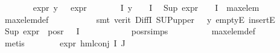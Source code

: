 \begin{isabellebody}
\ \ \ \ \ \ \isamarkupfalse%
\ {\isacartoucheopen}expr{\isacharunderscore}{\kern0pt}{}\ y\ {\isasymge}\ {}{\isacartoucheclose}\ {\isacartoucheopen}expr{\isacharunderscore}{\kern0pt}{}\ {\isasympsi}\ {\isasymge}\ {}{\isacartoucheclose}\ {\isacartoucheopen}{\isasympsi}\ {\isasymin}\ {\isasymPhi}\ {\isacharbackquote}{\kern0pt}\ I{\isacartoucheclose}\ {\isacartoucheopen}y\ {\isasymin}\ {\isasymPhi}\ {\isacharbackquote}{\kern0pt}\ I{\isacartoucheclose}\ \isamarkupfalse%
\ {\isachardoublequoteopen}Sup\ {\isacharparenleft}{\kern0pt}expr{\isacharunderscore}{\kern0pt}{}\ {\isacharbackquote}{\kern0pt}\ {\isacharparenleft}{\kern0pt}{\isacharparenleft}{\kern0pt}{\isasymPhi}\ {\isacharbackquote}{\kern0pt}\ I{\isacharparenright}{\kern0pt}\ {\isacharminus}{\kern0pt}\ {\isacharbraceleft}{\kern0pt}max{\isacharunderscore}{\kern0pt}elem{\isacharbraceright}{\kern0pt}{\isacharparenright}{\kern0pt}{\isacharparenright}{\kern0pt}\ {\isachargreater}{\kern0pt}{\isacharequal}{\kern0pt}\ {}{\isachardoublequoteclose}\isanewline
\ \ \ \ \ \ \ \ \isamarkupfalse%
\ max{\isacharunderscore}{\kern0pt}elem{\isacharunderscore}{\kern0pt}def\ \isanewline
\ \ \ \ \ \ \ \ \isamarkupfalse%
\ {\isacharparenleft}{\kern0pt}smt\ {\isacharparenleft}{\kern0pt}verit{\isacharparenright}{\kern0pt}\ DiffI\ SUP{\isacharunderscore}{\kern0pt}upper{}\ {\isacartoucheopen}{\isasympsi}\ {\isasymnoteq}\ y{\isacartoucheclose}\ emptyE\ insertE{\isacharparenright}{\kern0pt}\isanewline
\ \ \ \ \ \ \isamarkupfalse%
\ {\isachardoublequoteopen}Sup\ {\isacharparenleft}{\kern0pt}expr{\isacharunderscore}{\kern0pt}{}\ {\isacharbackquote}{\kern0pt}\ {\isacharparenleft}{\kern0pt}pos{\isacharunderscore}{\kern0pt}r\ {\isacharparenleft}{\kern0pt}{\isasymPhi}\ {\isacharbackquote}{\kern0pt}\ I{\isacharparenright}{\kern0pt}{\isacharparenright}{\kern0pt}{\isacharparenright}{\kern0pt}\ {\isasymge}\ {}{\isachardoublequoteclose}\isanewline
\ \ \ \ \ \ \ \ \isamarkupfalse%
\ pos{\isacharunderscore}{\kern0pt}r{\isachardot}{\kern0pt}simps\isanewline
\ \ \ \ \ \ \ \ \isamarkupfalse%
\ max{\isacharunderscore}{\kern0pt}elem{\isacharunderscore}{\kern0pt}def\ \isanewline
\ \ \ \ \ \ \ \ \isamarkupfalse%
\ metis\isanewline
\ \ \ \ \ \ \isamarkupfalse%
\ {\isachardoublequoteopen}expr{\isacharunderscore}{\kern0pt}{}\ {\isacharparenleft}{\kern0pt}hml{\isacharunderscore}{\kern0pt}conj\ I\ J\ {\isasymPhi}{\isacharparenright}{\kern0pt}\ {\isasymge}\ {}{\isachardoublequoteclose}\isanewline

\end{isabellebody}
